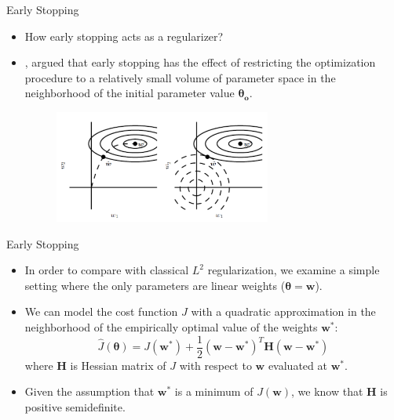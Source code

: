 \documentclass[10pt]{beamer}
\begin{document}
	\begin{frame}{Early Stopping}
		\begin{itemize}
			\item How early stopping acts as a regularizer? 
			\pause
			\item \citet{bishop1995regularization} , \citet{sjoberg1995overtraining} argued that early stopping has the effect of restricting the optimization procedure to a relatively small volume of parameter space in the neighborhood of the initial parameter value $\bm{\theta_o}$.
			\pause
			\begin{figure}
				\includegraphics[height=10em]{figures/early-stop-act-as-regularization.png}
			\end{figure}
		\end{itemize}
	\end{frame}
	
	\begin{frame}{Early Stopping}
		\begin{itemize}
			\item In order to compare with classical $L^2$ regularization, we examine a simple setting where the only parameters are linear weights ($\bm{\theta}=\bm{w}$). 
			\pause
			\item We can model the cost function $J$ with a quadratic approximation in the neighborhood of the empirically optimal value of the weights $\bm{w}^*$:
			$$\hat{J}(\bm{\theta})=J(\bm{w}^*)+\frac{1}{2}(\bm{w}-\bm{w}^*)^T\bm{H}(\bm{w}-\bm{w}^*)$$
			where $\bm{H}$ is Hessian matrix of $J$ with respect to $\bm{w}$ evaluated at $\bm{w}^*$.
			\pause
			\item Given the assumption that $\bm{w}^*$ is a minimum of $J(\bm{w})$, we know that $\bm{H}$ is positive semidefinite.
		\end{itemize}
	\end{frame}
	
\end{document}
